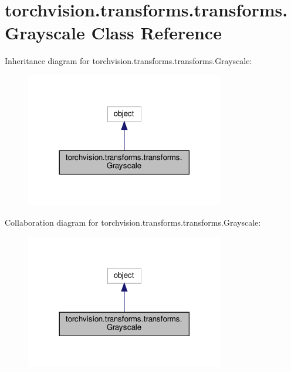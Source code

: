 \hypertarget{classtorchvision_1_1transforms_1_1transforms_1_1Grayscale}{}\section{torchvision.\+transforms.\+transforms.\+Grayscale Class Reference}
\label{classtorchvision_1_1transforms_1_1transforms_1_1Grayscale}


Inheritance diagram for torchvision.\+transforms.\+transforms.\+Grayscale\+:
\nopagebreak
\begin{figure}[H]
\begin{center}
\leavevmode
\includegraphics[width=246pt]{classtorchvision_1_1transforms_1_1transforms_1_1Grayscale__inherit__graph}
\end{center}
\end{figure}


Collaboration diagram for torchvision.\+transforms.\+transforms.\+Grayscale\+:
\nopagebreak
\begin{figure}[H]
\begin{center}
\leavevmode
\includegraphics[width=246pt]{classtorchvision_1_1transforms_1_1transforms_1_1Grayscale__coll__graph}
\end{center}
\end{figure}
